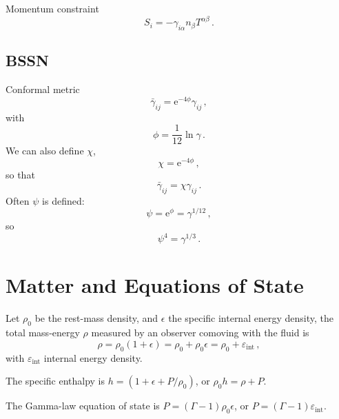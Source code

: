 \documentclass[]{scrartcl}
\begin{document}
Momentum constraint
\begin{equation}
  \label{eq:9}
  S_i = - \gamma_{i\alpha} n_\beta T^{\alpha\beta}\,.
\end{equation}

\subsection{BSSN}
\label{sec:bssn}

Conformal metric
\begin{equation}
  \label{eq:17}
  \bar{\gamma}_{ij} = \mathrm{e}^{-4\phi} \gamma_{ij}\,,
\end{equation}
with
\begin{equation}
  \label{eq:21}
  \phi = \frac{1}{12}\ln{\gamma}\,.
\end{equation}
We can also define $\chi$,
\begin{equation}
  \label{eq:22}
  \chi = \mathrm{e}^{-4\phi}\,,
\end{equation}
so that
\begin{equation}
  \label{eq:23}
  \bar{\gamma}_{ij} =\chi \gamma_{ij}\,.
\end{equation}
Often $\psi$ is defined:
\begin{equation}
  \label{eq:24}
  \psi = \mathrm{e}^{\phi} = \gamma^{1\slash12}\,,
\end{equation}
so
\begin{equation}
  \label{eq:25}
  \psi^{4} = \gamma^{1\slash3}\,.
\end{equation}

\section{Matter and Equations of State}
\label{sec:matter}

Let $\rho_0$ be the rest-mass density, and $\epsilon$ the specific internal energy
density, the total mass-energy $\rho$ measured by an observer comoving with the
fluid is
\begin{equation}
  \label{eq:6}
  \rho = \rho_0 (1 + \epsilon) = \rho_0 + \rho_0 \epsilon = \rho_0 + \varepsilon_{\text{int}}\,,
\end{equation}
with $\varepsilon_{\text{int}}$ internal energy density.

The specific enthalpy is $h = (1 + \epsilon + P\slash \rho_0)$, or $\rho_0 h = \rho + P$.

The Gamma-law equation of state is $P = (\Gamma - 1) \rho_0 \epsilon$, or $P = (\Gamma - 1) \varepsilon_{\text{int}}$.
\end{document}
